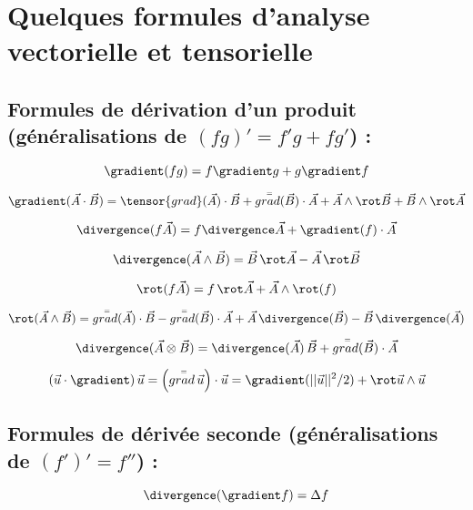 
\clearpage


\section{Quelques formules d'analyse vectorielle et tensorielle}



\subsection{ Formules de dérivation d'un produit  (généralisations de $(fg)' = f'g + fg'$) :}


$$
\gradient ( fg) = f \gradient g + g \gradient f
$$

$$
\gradient ( \vec{A} \cdot \vec{B} ) = 
\tensor{grad}( \vec{A} ) \cdot \vec{B}
+
\mytensor{grad}( \vec{B} ) \cdot \vec{A}
+
\vec{A} \wedge \rot \vec{B} +  \vec{B} \wedge \rot \vec{A}
$$

$$
\divergence(f \vec{A} ) = f \divergence \vec{A} + \gradient (f) \cdot \vec{A}
$$

$$
\divergence(\vec{A} \wedge \vec{B} ) = \vec{B} \, \rot  \vec{A} 
-\vec{A} \, \rot \vec{B}
$$

$$
\rot ( f \vec{A} ) = f \, \rot \vec{A} + \vec{A} \wedge \rot (f)
$$

$$
\rot ( \vec{A}  \wedge \vec{B} ) = \mytensor{grad}( \vec{A} ) \cdot \vec{B}
-
\mytensor{grad}( \vec{B} ) \cdot \vec{A}
+
\vec{A} \, \divergence (\vec{B}) -  \vec{B} \, \divergence( \vec{A})
$$

$$
\divergence ( \vec{A} \otimes \vec{B} ) = \divergence (\vec{A}) \, \vec{B} 
+\mytensor{grad}( \vec{B} ) \cdot \vec{A}
 $$

$$
\left( \vec{u} \cdot \gradient \right)  \vec{u} 
= \left( \mytensor{grad} \, \vec{u} \right) \cdot \vec{u}
= \gradient ( ||\vec{u}||^2 /2 ) + \rot \vec{u} \wedge \vec{u}
$$ 




\subsection{Formules de dérivée seconde (généralisations de $(f')' = f''$) :}

$$
\divergence (\gradient  f) = \Delta f 
$$

